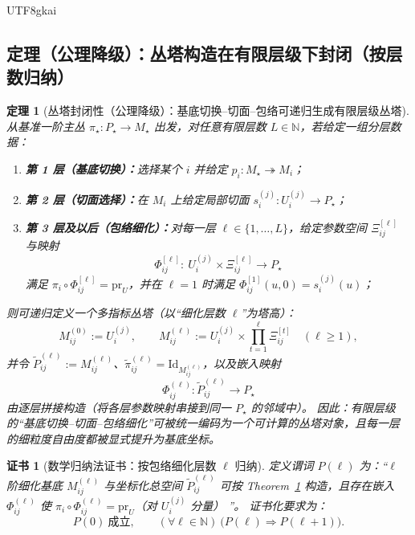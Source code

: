 \documentclass[12pt]{article}
\newtheorem{theorem}{定理}[section]
\newtheorem{certificate}{证书}[section]
\begin{document}
\begin{CJK*}{UTF8}{gkai}
\subsection{定理（公理降级）：丛塔构造在有限层级下封闭（按层数归纳）}

\begin{theorem}[丛塔封闭性（公理降级）：基底切换--切面--包络可递归生成有限层级丛塔]
\label{thm:bundle-tower-closure}
从基准一阶主丛 $\pi_\star:P_\star\to M_\star$ 出发，对任意有限层数 $L\in\mathbb{N}$，若给定一组分层数据：
\begin{enumerate}
  \item \textbf{第 1 层（基底切换）：}选择某个 $i$ 并给定 $p_i:M_\star\twoheadrightarrow M_i$；
  \item \textbf{第 2 层（切面选择）：}在 $M_i$ 上给定局部切面 $s_i^{(j)}:U_i^{(j)}\to P_\star$；
  \item \textbf{第 3 层及以后（包络细化）：}对每一层 $\ell\in\{1,\ldots,L\}$，给定参数空间 $\Xi_{ij}^{[\ell]}$ 与映射
  \[
  \Phi_{ij}^{[\ell]}:\ U_i^{(j)}\times \Xi_{ij}^{[\ell]}\to P_\star
  \]
  满足 $\pi_i\circ \Phi_{ij}^{[\ell]}=\mathrm{pr}_{U}$，并在 $\ell=1$ 时满足 $\Phi_{ij}^{[1]}(u,0)=s_i^{(j)}(u)$；
\end{enumerate}
则可递归定义一个多指标丛塔（以“细化层数 $\ell$”为塔高）：
\[
M_{ij}^{(0)}:=U_i^{(j)},\qquad
M_{ij}^{(\ell)}:=U_i^{(j)}\times \prod_{t=1}^{\ell}\Xi_{ij}^{[t]}\quad(\ell\ge 1),
\]
并令 $\tilde P_{ij}^{(\ell)}:=M_{ij}^{(\ell)}$、$\tilde\pi_{ij}^{(\ell)}=\mathrm{Id}_{M_{ij}^{(\ell)}}$，以及嵌入映射
\[
\Phi_{ij}^{(\ell)}:\tilde P_{ij}^{(\ell)}\to P_\star
\]
由逐层拼接构造（将各层参数映射串接到同一 $P_\star$ 的邻域中）。
因此：有限层级的“基底切换--切面--包络细化”可被统一编码为一个可计算的丛塔对象，且每一层的细粒度自由度都被显式提升为基底坐标。
\end{theorem}

\begin{certificate}[数学归纳法证书：按包络细化层数 $\ell$ 归纳]
\label{cert:bundle-tower-closure-induction}
定义谓词 $P(\ell)$ 为：“$\ell$ 阶细化基底 $M_{ij}^{(\ell)}$ 与坐标化总空间 $\tilde P_{ij}^{(\ell)}$ 可按 Theorem~\ref{thm:bundle-tower-closure} 构造，且存在嵌入 $\Phi_{ij}^{(\ell)}$ 使 $\pi_i\circ \Phi_{ij}^{(\ell)}=\mathrm{pr}_{U}$（对 $U_i^{(j)}$ 分量）
  ”。
证书化要求为：
\[
P(0)\ \text{成立},\qquad
(\forall \ell\in\mathbb{N})\ \bigl(P(\ell)\Rightarrow P(\ell+1)\bigr).
\]
\end{certificate}


\end{CJK*}
\end{document}
